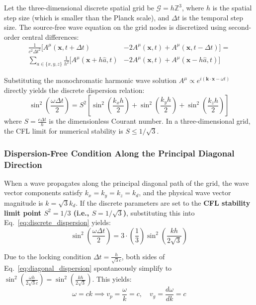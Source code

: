 \documentclass[12pt, a4paper]{article}
\begin{document}
Let the three-dimensional discrete spatial grid be $\mathcal{G} = h\mathbb{Z}^3$, where $h$ is the spatial step size (which is smaller than the Planck scale), and $\Delta t$ is the temporal step size. The source-free wave equation on the grid nodes is discretized using second-order central differences:
\begin{equation}
\label{eq:discrete_wave}
\begin{split}
\frac{1}{c^2 \Delta t^2} \big[ A^\mu(\mathbf{x}, t+\Delta t) &- 2A^\mu(\mathbf{x}, t) + A^\mu(\mathbf{x}, t-\Delta t) \big] = \\
\sum_{a \in \{x,y,z\}} \frac{1}{h^2} \big[ A^\mu(\mathbf{x} + h\hat{a}, t) &- 2A^\mu(\mathbf{x}, t) + A^\mu(\mathbf{x} - h\hat{a}, t) \big]
\end{split}
\end{equation}

Substituting the monochromatic harmonic wave solution $A^\mu \propto e^{i(\mathbf{k}\cdot\mathbf{x} - \omega t)}$ directly yields the discrete dispersion relation:
\begin{equation}
\label{eq:discrete_dispersion}
\sin^2\left(\frac{\omega \Delta t}{2}\right) = S^2 \left[ \sin^2\left(\frac{k_x h}{2}\right) + \sin^2\left(\frac{k_y h}{2}\right) + \sin^2\left(\frac{k_z h}{2}\right) \right]
\end{equation}
where $S = \frac{c \Delta t}{h}$ is the dimensionless Courant number. In a three-dimensional grid, the CFL limit for numerical stability is $S \le 1/\sqrt{3}$.

\subsubsection{Dispersion-Free Condition Along the Principal Diagonal Direction}

When a wave propagates along the principal diagonal path of the grid, the wave vector components satisfy $k_x = k_y = k_z = k_d$, and the physical wave vector magnitude is $k = \sqrt{3}k_d$. If the discrete parameters are set to the \textbf{CFL stability limit point $S^2 = 1/3$ (i.e., $S = 1/\sqrt{3}$)}, substituting this into Eq.~\eqref{eq:discrete_dispersion} yields:
\begin{equation}
\label{eq:diagonal_dispersion}
\sin^2\left(\frac{\omega \Delta t}{2}\right) = 3 \cdot \left(\frac{1}{3}\right) \sin^2\left(\frac{k h}{2\sqrt{3}}\right)
\end{equation}

Due to the locking condition $\Delta t = \frac{h}{\sqrt{3}c}$, both sides of Eq.~\eqref{eq:diagonal_dispersion} spontaneously simplify to $\sin^2\left(\frac{\omega h}{2\sqrt{3}c}\right) = \sin^2\left(\frac{k h}{2\sqrt{3}}\right)$. This yields:
\begin{equation}
\label{eq:speed_of_light}
\omega = c k \implies v_p = \frac{\omega}{k} = c, \quad v_g = \frac{d\omega}{dk} = c
\end{equation}
\end{document}
